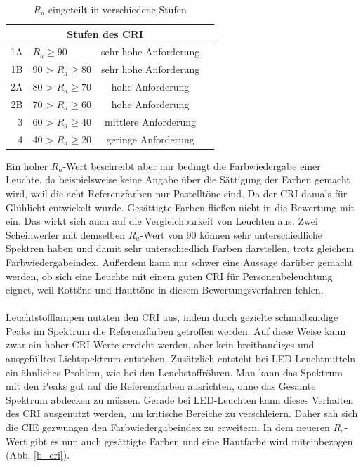 	\begin{table}[htp] 
		\centering
		\begin{tabular}{rlcc}  %
		\toprule
		\multicolumn{3}{c}{\large\sffamily Stufen des CRI}\\ 							
		\midrule
		1A & $R_{a} \geq 90$ & sehr hohe Anforderung\\ 
		1B & 90 > $R_{a} \geq 80$ & sehr hohe Anforderung\\
		2A & 80 > $R_{a} \geq 70$ & hohe Anforderung\\
		2B & 70 > $R_{a} \geq 60$ & hohe Anforderung\\
		3 & 60 > $R_{a} \geq 40$ & mittlere Anforderung\\
		4 & 40 > $R_{a} \geq 20$ & geringe Anforderung\\
		\bottomrule
		\end{tabular}
		\caption{$R_{a}$ eingeteilt in verschiedene Stufen\protect\footnotemark}	
		\label{t_cri}
	\end{table}

\noindent Ein hoher $R_{a}$-Wert beschreibt aber nur bedingt die Farbwiedergabe einer Leuchte, da beispielsweise keine Angabe über die Sättigung der Farben gemacht wird, weil die acht Referenzfarben nur Pastelltöne sind. Da der CRI damals für Glühlicht entwickelt wurde. Gesättigte Farben fließen nicht in die Bewertung mit ein.
Das wirkt sich auch auf die Vergleichbarkeit von Leuchten aus. Zwei Scheinwerfer mit demselben $R_{a}$-Wert von 90 können sehr unterschiedliche Spektren haben und damit sehr unterschiedlich Farben darstellen, trotz gleichem Farbwiedergabeindex.
Außerdem kann nur schwer eine Aussage darüber gemacht werden, ob sich eine Leuchte mit einem guten CRI für Personenbeleuchtung eignet, weil Rottöne und Hauttöne in diesem Bewertungsverfahren fehlen.\\\\
Leuchtstofflampen nutzten den CRI aus, indem durch gezielte schmalbandige Peaks im Spektrum die Referenzfarben getroffen werden. Auf diese Weise kann zwar ein hoher CRI-Werte erreicht werden, aber kein breitbandiges und ausgefülltes Lichtspektrum entstehen. Zusätzlich entsteht bei LED-Leuchtmitteln ein ähnliches Problem, wie bei den Leuchstoffröhren. Man kann das Spektrum mit den Peaks gut auf die Referenzfarben ausrichten, ohne das Gesamte Spektrum abdecken zu müssen. Gerade bei LED-Leuchten kann dieses Verhalten des CRI ausgenutzt werden, um kritische Bereiche zu verschleiern. Daher sah sich die CIE gezwungen den Farbwiedergabeindex zu erweitern. In dem neueren $R_{e}$-Wert gibt es nun auch gesättigte Farben und eine Hautfarbe wird miteinbezogen (Abb. \ref{b_cri}).

